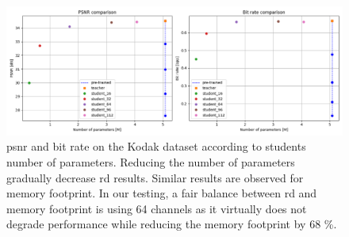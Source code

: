 \documentclass{article}
\begin{document}
\begin{figure}
    \centering
    \includegraphics[width=15cm]{kd_lic_parameters.png}
    \caption[\acrshort{psnr} and bit rate on the Kodak dataset according to students number of parameters.]{\acrshort{psnr} and bit rate on the Kodak dataset according to students number of parameters. Reducing the number of parameters gradually decrease \acrshort{rd} results. Similar results are observed for memory footprint. In our testing, a fair balance between \acrshort{rd} and memory footprint is using 64 channels as it virtually does not degrade performance while reducing the memory footprint by 68 \%.}
    \label{kd_lic_parameters}
\end{figure}

\end{document}
